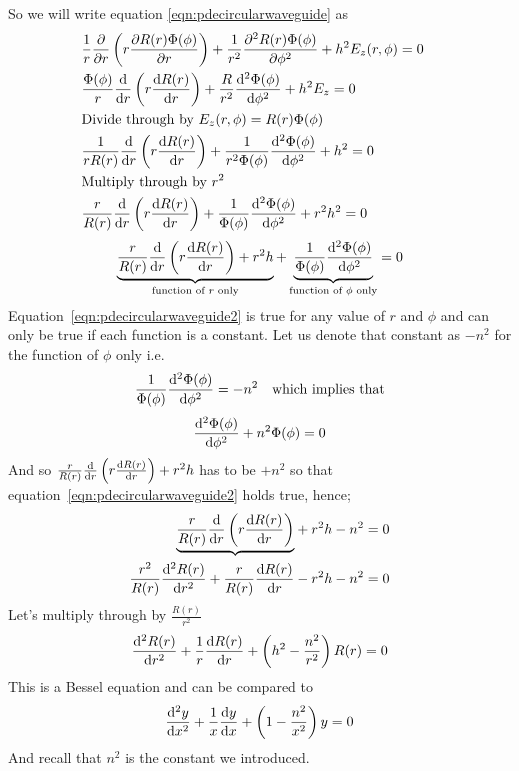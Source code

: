 So we will write equation \ref{eqn:pdecircularwaveguide} as 
\begin{align*}
&\frac{1}{r}\partialderivative{}{r}\left(r\partialderivative{R(r)\Phi(\phi)}{r}\right) + \frac{1}{r^2}\partialderivative[2]{R(r)\Phi(\phi)}{\phi} + h^2E_z(r,\phi) = 0\\
&\frac{\Phi(\phi)}{r}\derivative{}{r}\left(r\derivative{R(r)}{r}\right) + \frac{R}{r^2}\derivative[2]{\Phi(\phi)}{\phi} + h^2 E_z = 0\\
&\text{Divide through by }E_z(r,\phi)=R(r)\Phi(\phi)&\\
&\frac{1}{rR(r)}\derivative{}{r}\left(r\derivative{R(r)}{r}\right) + \frac{1}{r^2\Phi(\phi)}\derivative[2]{\Phi(\phi)}{\phi} + h^2 = 0\\
&\text{Multiply through by }r^2\\
&\frac{r}{R(r)}\derivative{}{r}\left(r\derivative{R(r)}{r}\right) + \frac{1}{\Phi(\phi)}\derivative[2]{\Phi(\phi)}{\phi} + r^2h^2 = 0
\end{align*}
\begin{dmath}
\underbrace{\frac{r}{R(r)}\derivative{}{r}\left(r\derivative{R(r)}{r}\right) + r^2 h}_{\text{function of }r\text{ only}} 
+ \underbrace{\frac{1}{\Phi(\phi)}\derivative[2]{\Phi(\phi)}{\phi}}_{\text{function of }\phi\text{ only}} = 0 
\label{eqn:pdecircularwaveguide2} 
\end{dmath}
Equation~\eqref{eqn:pdecircularwaveguide2} is true for any value of $r$ and $\phi$ and can only be true if each function is a constant. Let us denote that constant as $-n^2$ for the function of $\phi$ only i.e. 
\begin{align*}
\frac{1}{\Phi(\phi)}\derivative[2]{\Phi(\phi)}{\phi}=-n^2\quad\text{which implies that}
\end{align*}
\begin{equation}
\derivative[2]{\Phi(\phi)}{\phi} + n^2\Phi(\phi) = 0
\label{eqn:pdecircularwaveguide3}
\end{equation}
And so $\frac{r}{R(r)}\derivative{}{r}\left(r\derivative{R(r)}{r}\right) + r^2 h$ has to be $+n^2$ so that equation~\eqref{eqn:pdecircularwaveguide2} holds true, hence;
\begin{align*}
\underbrace{\frac{r}{R(r)}\derivative{}{r}\left(r\derivative{R(r)}{r}\right)}& + r^2h - n^2 = 0\\
\frac{r^2}{R(r)}\derivative[2]{R(r)}{r} + \frac{r}{R(r)}\derivative{R(r)}{r}& - r^2h-n^2=0
\end{align*}
Let's multiply through by $\frac{R(r)}{r^2}$
\begin{equation}
\derivative[2]{R(r)}{r}+\frac{1}{r}\derivative{R(r)}{r} + \left(h^2-\frac{n^2}{r^2}\right)R(r)=0
\label{eqn:pdecircularwaveguide4}
\end{equation}
This is a Bessel equation and can be compared to 
\begin{align*}
\derivative[2]{y}{x}+\frac{1}{x}\derivative{y}{x}+\left(1-\frac{n^2}{x^2}\right)y = 0
\end{align*}
And recall that $n^2$ is the constant we introduced.

